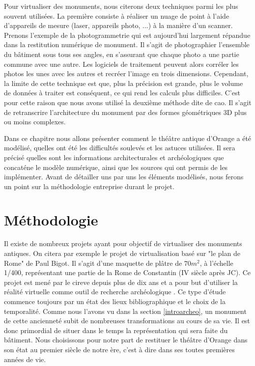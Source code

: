Pour virtualiser des monuments, nous citerons deux techniques parmi les plus souvent utilisées. La première consiste à réaliser un nuage de point à l'aide d'appareils de mesure (laser, appareils photo, ...) à la manière d'un scanner. Prenons l'exemple de la photogrammetrie qui est aujourd'hui largement répandue dans la restitution numérique de monument. Il s'agit de photographier l'ensemble du bâtiment sous tous ses angles, en s'assurant que chaque photo a une partie commune avec une autre. Les logiciels de traitement peuvent alors corréler les photos les unes avec les autres et recréer l'image en trois dimensions. Cependant, la limite de cette technique est que, plus la précision est grande, plus le volume de données à traiter est conséquent, ce qui rend les calculs plus difficiles. C'est pour cette raison que nous avons utilisé la deuxième méthode dite de \gls{cao}. Il s'agit de retranscrire l'architecture du monument par des formes géométriques 3D plus ou moins complexes.

Dans ce chapitre nous allons présenter comment le théâtre antique d'Orange a été modélisé, quelles ont été les difficultés soulevés et les astuces utilisées. Il sera précisé quelles sont les informations architecturales et archéologiques que concaténe le modèle numérique, ainsi que les sources qui ont permis de les implémenter.
Avant de détailler uns par uns les éléments modélisés, nous ferons un point sur la méthodologie entreprise durant le projet.


\section{Méthodologie}

Il existe de nombreux projets ayant pour objectif de virtualiser des monuments antiques. On citera par exemple le projet de virtualisation basé sur "le plan de Rome" de Paul Bigot. Il s'agit d'une maquette de plâtre de $70m^2$, à l'échelle 1/400, représentant une partie de la Rome de Constantin (IV siècle après JC). Ce projet est mené par le \gls{cireve} depuis plus de dix ans et a pour but d'utiliser la réalité virtuelle comme outil de recherche archéologique \cite{fleury}. Ce type d'étude commence toujours par un état des lieux bibliographique et le choix de la temporalité. Comme nous l'avons vu dans la section \ref{introarcheo}, un monument de cette ancienneté subit de nombreuses transformations au cours de sa vie. Il est donc primordial de situer dans le temps la représentation qui sera faite du bâtiment. Nous choisissons pour notre part de restituer le théâtre d'Orange dans son état au premier siècle de notre ère, c'est à dire dans ses toutes premières années de vie.



